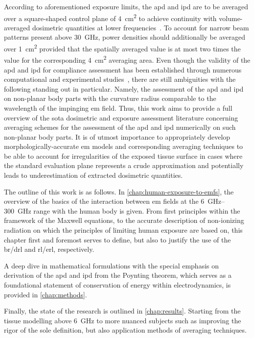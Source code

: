 According to aforementioned exposure limits, the \gls{apd} and \gls{ipd} are to be averaged over a square-shaped control plane of \SI{4}{\cm\squared} to achieve continuity with volume-averaged dosimetric quantities at lower frequencies~\cite{Foster2016Thermal,Hashimoto2017On}.
To account for narrow beam patterns present above \SI{30}{\GHz}, power densities should additionally be averaged over \SI{1}{\cm\squared} provided that the spatially averaged value is at most two times the value for the corresponding \SI{4}{\cm\squared} averaging area.
Even though the validity of the \gls{apd} and \gls{ipd} for compliance assessment has been established through numerous computational and experimental studies~\cite{Hirata2021Human}, there are still ambiguities with the following standing out in particular.
Namely, the assessment of the \gls{apd} and \gls{ipd} on non-planar body parts with the curvature radius comparable to the wavelength of the impinging \gls{em} field.
Thus, this work aims to provide a full overview of the \gls{sota} dosimetric and exposure assessment literature concerning averaging schemes for the assessment of the \gls{apd} and \gls{ipd} numerically on such non-planar body parts.
It is of utmost importance to appropriately develop morphologically-accurate \gls{em} models and corresponding averaging techniques to be able to account for irregularities of the exposed tissue surface in cases where the standard evaluation plane represents a crude approximation and potentially leads to underestimation of extracted dosimetric quantities.

The outline of this work is as follows.
In \cref{chap:human-exposure-to-emfs}, the overview of the basics of the interaction between \gls{em} fields at the \SIrange[range-units=single,range-phrase=--]{6}{300}{\GHz} range with the human body is given.
From first principles within the framework of the Maxwell equations, to the accurate description of non-ionizing radiation on which the principles of limiting human exposure are based on, this chapter first and foremost serves to define, but also to justify the use of the \gls{br}/\gls{drl} and \gls{rl}/\gls{erl}, respectively.

A deep dive in mathematical formulations with the special emphasis on derivation of the \gls{apd} and \gls{ipd} from the Poynting theorem, which serves as a foundational statement of conservation of energy within electrodynamics, is provided in \cref{chap:methods}.

Finally, the state of the research is outlined in \cref{chap:results}.
Starting from the tissue modelling above \SI{6}{\GHz} to more nuanced subjects such as improving the rigor of the sole definition, but also application methods of averaging techniques.
